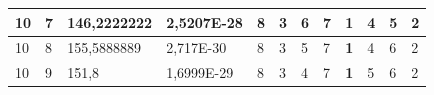 \documentclass[conference]{IEEEtran}
\begin{document}
\begin{table}[]
\begin{tabular}{|llll|llllllll|}
\multicolumn{1}{|l|}{10}                                                             & \multicolumn{1}{l|}{7}                                                                 & \multicolumn{1}{l|}{146,2222222}                                                           & 2,5207E-28                              & \multicolumn{1}{l|}{8}                                                           & \multicolumn{1}{l|}{3}                                                           & \multicolumn{1}{l|}{6}                                                           & \multicolumn{1}{l|}{7}                                                           & \multicolumn{1}{l|}{\textbf{1}}                                                  & \multicolumn{1}{l|}{4}                                                           & \multicolumn{1}{l|}{5}                                                           & 2                                   \\ \hline
\multicolumn{1}{|l|}{10}                                                             & \multicolumn{1}{l|}{8}                                                                 & \multicolumn{1}{l|}{155,5888889}                                                           & 2,717E-30                               & \multicolumn{1}{l|}{8}                                                           & \multicolumn{1}{l|}{3}                                                           & \multicolumn{1}{l|}{5}                                                           & \multicolumn{1}{l|}{7}                                                           & \multicolumn{1}{l|}{\textbf{1}}                                                  & \multicolumn{1}{l|}{4}                                                           & \multicolumn{1}{l|}{6}                                                           & 2                                   \\ \hline
\multicolumn{1}{|l|}{10}                                                             & \multicolumn{1}{l|}{9}                                                                 & \multicolumn{1}{l|}{151,8}                                                                 & 1,6999E-29                              & \multicolumn{1}{l|}{8}                                                           & \multicolumn{1}{l|}{3}                                                           & \multicolumn{1}{l|}{4}                                                           & \multicolumn{1}{l|}{7}                                                           & \multicolumn{1}{l|}{\textbf{1}}                                                  & \multicolumn{1}{l|}{5}                                                           & \multicolumn{1}{l|}{6}                                                           & 2                                   \\ \hline

\end{tabular}
\end{table}
\end{document}
